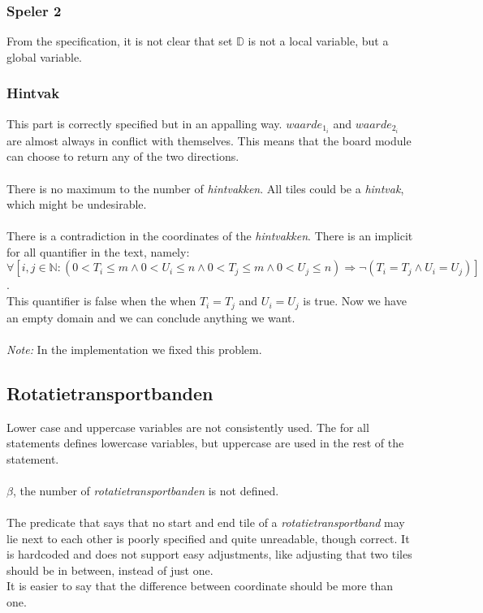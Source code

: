 \documentclass[a4paper,twoside,11pt]{article}
\begin{document}
  \subsubsection{Speler 2} %
  \label{sub:speler_2}
    From the specification, it is not clear that set $\mathbb{D}$ is not a local variable, but a global variable.

  \subsubsection{Hintvak} %
  \label{sub:hintvak}
    This part is correctly specified but in an appalling way.  $waarde_{1_{i}} $ and
    $waarde_{2_{i}}$ are almost always in conflict with themselves. This means that the board module can choose to return any of the two directions.  \\ \\
    There is no maximum to the number of \emph{hintvakken}. All tiles could be a \emph{hintvak}, which might be undesirable. \\ \\
    There is a contradiction in the coordinates of the \emph{hintvakken}. There is an implicit for all quantifier in the text, namely: $\forall [i,j \in \mathbb{N}: (0 < T_{i} \leq m \land 0 < U_{i} \leq n \land 0 < T_{j} \leq m \land 0 < U_{j} \leq n)  \Rightarrow \neg (T_{i} = T_{j} \land U_{i} = U_{j}) ]$. \\
    This quantifier is false when the when $T_{i} = T_{j}$ and $U_{i} = U_{j}$ is true. Now we have an empty domain and we can conclude anything we want. \\ \\
    \emph{Note:} In the implementation we fixed this problem.

  
  \subsection{Rotatietransportbanden} %
  \label{sub:rotatietransportbanden}
    Lower case and uppercase variables are not consistently used. The for all statements defines lowercase variables, but uppercase are used in the rest of the statement.\\ \\
    $\beta$, the number of \emph{rotatietransportbanden} is not defined. \\ \\
    The predicate that says that no start and end tile of a \emph{rotatietransportband} may lie next to each other is poorly specified and quite unreadable, though correct. It is hardcoded and does not support easy adjustments, like adjusting that two tiles should be in between, instead of just one. \\
    It is easier to say that the difference between coordinate should be more than one. \\ \\
  
\end{document}
